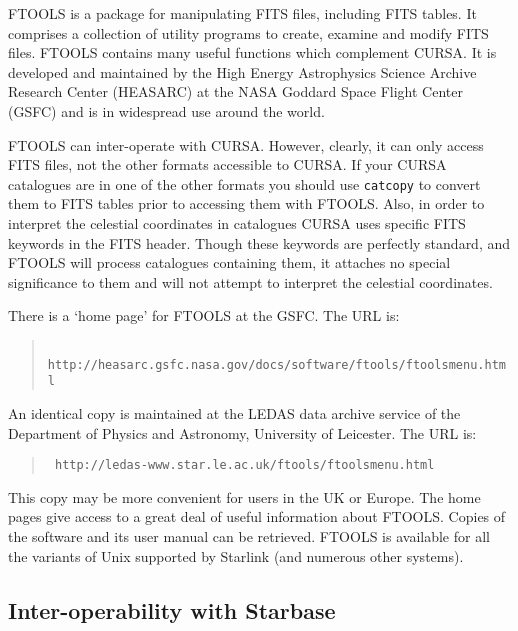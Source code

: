 \documentclass[twoside,11pt]{article}
\newcommand{\htmladdnormallink}[2]{#1}
\renewcommand{\_}{\texttt{\symbol{95}}}
\begin{document}
FTOOLS is a package for manipulating FITS files, including FITS tables.
It comprises a collection of utility programs to create, examine and
modify FITS files.  FTOOLS contains many useful functions which
complement CURSA.  It is developed and maintained by the High Energy
Astrophysics Science Archive Research Center (HEASARC) at the NASA
Goddard Space Flight Center (GSFC) and is in widespread use around the
world.

FTOOLS can inter-operate with CURSA.  However, clearly, it can only
access FITS files, not the other formats accessible to CURSA.  If
your CURSA catalogues are in one of the other formats you should use
{\tt catcopy} to convert them to FITS tables prior to accessing them
with FTOOLS.  Also, in order to interpret the celestial coordinates
in catalogues CURSA uses specific FITS keywords in the FITS header.
Though these keywords are perfectly standard, and FTOOLS will process
catalogues containing them, it attaches no special significance to them
and will not attempt to interpret the celestial coordinates.

There is a `home page' for FTOOLS at the GSFC.  The URL is:

\begin{quote}
\htmladdnormallink{{\tt
http://heasarc.gsfc.nasa.gov/docs/software/ftools/ftools\_menu.html}}
{http://heasarc.gsfc.nasa.gov/docs/software/ftools/ftools_menu.html}
\end{quote}

An identical copy is maintained at the LEDAS data archive service of
the Department of Physics and Astronomy, University of Leicester.  The
URL is:

\begin{quote}
\htmladdnormallink{{\tt
http://ledas-www.star.le.ac.uk/ftools/ftools\_menu.html}}
{http://ledas-www.star.le.ac.uk/ftools/ftools_menu.html}
\end{quote}

This copy may be more convenient for users in the UK or Europe.  The
home pages give access to a great deal of useful information about
FTOOLS.  Copies of the software and its user manual can be retrieved.
FTOOLS is available for all the variants of Unix supported by Starlink
(and numerous other systems).

\subsection{\label{STARBASE}Inter-operability with Starbase}
\end{document}
